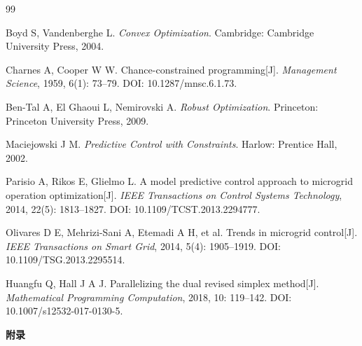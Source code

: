 \documentclass{cumcmthesis}
\begin{document}
\begin{thebibliography}{99}

Boyd S, Vandenberghe L. \textit{Convex Optimization}. Cambridge: Cambridge University Press, 2004.

Charnes A, Cooper W W. Chance-constrained programming[J]. \textit{Management Science}, 1959, 6(1): 73--79. DOI: 10.1287/mnsc.6.1.73.

Ben-Tal A, El Ghaoui L, Nemirovski A. \textit{Robust Optimization}. Princeton: Princeton University Press, 2009.

Maciejowski J M. \textit{Predictive Control with Constraints}. Harlow: Prentice Hall, 2002.

Parisio A, Rikos E, Glielmo L. A model predictive control approach to microgrid operation optimization[J]. \textit{IEEE Transactions on Control Systems Technology}, 2014, 22(5): 1813--1827. DOI: 10.1109/TCST.2013.2294777.

Olivares D E, Mehrizi-Sani A, Etemadi A H, et al. Trends in microgrid control[J]. \textit{IEEE Transactions on Smart Grid}, 2014, 5(4): 1905--1919. DOI: 10.1109/TSG.2013.2295514.

Huangfu Q, Hall J A J. Parallelizing the dual revised simplex method[J]. \textit{Mathematical Programming Computation}, 2018, 10: 119--142. DOI: 10.1007/s12532-017-0130-5.

\end{thebibliography}

\begin{center}
{\bfseries 附录\par}
\vspace{0.6em}
\end{center}
\end{document}
